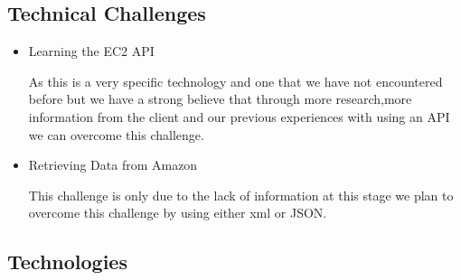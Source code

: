 \documentclass{scrartcl}
\begin{document}
\subsection{Technical Challenges}
\begin{itemize}
\item Learning the EC2 API 

As this is a very specific technology and one that we have not encountered before but we have a strong believe that 
through more research,more information from the client and our previous experiences with using an API we can overcome this challenge.

\item Retrieving Data from Amazon

This challenge is only due to the lack of information at this stage we plan to overcome this challenge by using either xml or JSON.
\end{itemize}
\subsection{Technologies}
\end{document}
